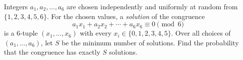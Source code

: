 Integers $a_1,a_2,\dots,a_6$ are chosen independently and uniformly at random from $\{1,2,3,4,5,6\}$. For the chosen values, a \emph{solution} of the congruence
\[
a_1x_1+a_2x_2+\cdots+a_6x_6\equiv0\pmod 6
\]
is a $6$-tuple $(x_1,\dots,x_6)$ with every $x_i\in\{0,1,2,3,4,5\}$. Over all choices of $(a_1,\dots,a_6)$, let $S$ be the minimum number of solutions. Find the probability that the congruence has exactly $S$ solutions.
